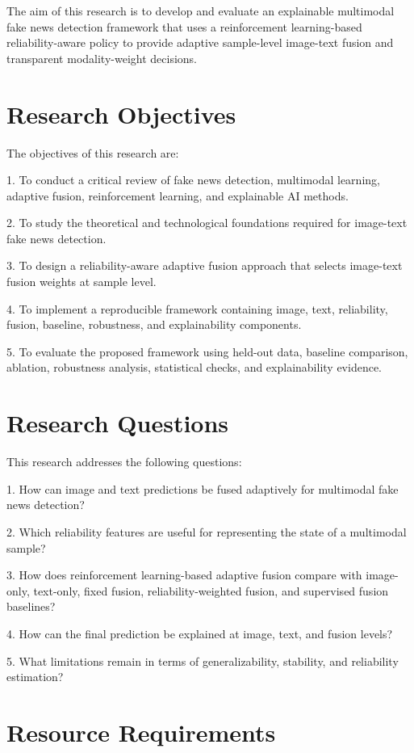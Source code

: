 The aim of this research is to develop and evaluate an explainable multimodal fake news detection framework that uses a reinforcement learning-based reliability-aware policy to provide adaptive sample-level image-text fusion and transparent modality-weight decisions.


\section{Research Objectives}


The objectives of this research are:


1. To conduct a critical review of fake news detection, multimodal learning, adaptive fusion, reinforcement learning, and explainable AI methods.

2. To study the theoretical and technological foundations required for image-text fake news detection.

3. To design a reliability-aware adaptive fusion approach that selects image-text fusion weights at sample level.

4. To implement a reproducible framework containing image, text, reliability, fusion, baseline, robustness, and explainability components.

5. To evaluate the proposed framework using held-out data, baseline comparison, ablation, robustness analysis, statistical checks, and explainability evidence.


\section{Research Questions}


This research addresses the following questions:


1. How can image and text predictions be fused adaptively for multimodal fake news detection?

2. Which reliability features are useful for representing the state of a multimodal sample?

3. How does reinforcement learning-based adaptive fusion compare with image-only, text-only, fixed fusion, reliability-weighted fusion, and supervised fusion baselines?

4. How can the final prediction be explained at image, text, and fusion levels?

5. What limitations remain in terms of generalizability, stability, and reliability estimation?


\section{Resource Requirements}


